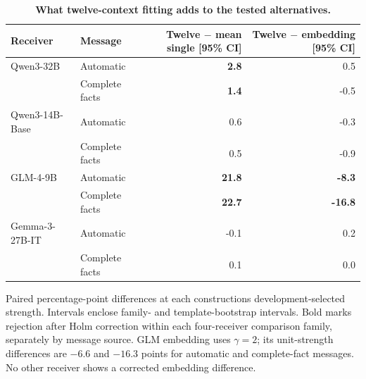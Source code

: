 \begin{table}[H]
\caption{\textbf{What twelve-context fitting adds to the tested alternatives.}}
\label{tab:wordif_representation_contrasts}
\centering\small
\setlength{\tabcolsep}{3pt}\renewcommand{\arraystretch}{1.12}
\begin{tabular*}{\linewidth}{@{\extracolsep{\fill}}llrr@{}}
\toprule
Receiver & Message & \shortstack[r]{Twelve $-$ mean single\\{[95\% CI]}} & \shortstack[r]{Twelve $-$ embedding\\{[95\% CI]}} \\
\midrule
Qwen3-32B & Automatic & \textbf{2.8}\enspace {\footnotesize [1.0, 5.1]} & 0.5\enspace {\footnotesize [-0.7, 1.9]} \\
 & Complete facts & \textbf{1.4}\enspace {\footnotesize [0.6, 2.4]} & -0.5\enspace {\footnotesize [-1.2, 0.0]} \\
Qwen3-14B-Base & Automatic & 0.6\enspace {\footnotesize [0.0, 1.2]} & -0.3\enspace {\footnotesize [-1.2, 0.3]} \\
 & Complete facts & 0.5\enspace {\footnotesize [-0.8, 1.6]} & -0.9\enspace {\footnotesize [-2.1, 0.0]} \\
GLM-4-9B & Automatic & \textbf{21.8}\enspace {\footnotesize [17.1, 26.2]} & \textbf{-8.3}\enspace {\footnotesize [-12.0, -4.9]} \\
 & Complete facts & \textbf{22.7}\enspace {\footnotesize [17.3, 27.7]} & \textbf{-16.8}\enspace {\footnotesize [-27.1, -7.3]} \\
Gemma-3-27B-IT & Automatic & -0.1\enspace {\footnotesize [-0.3, 0.0]} & 0.2\enspace {\footnotesize [0.0, 0.5]} \\
 & Complete facts & 0.1\enspace {\footnotesize [0.0, 0.2]} & 0.0\enspace {\footnotesize [0.0, 0.0]} \\
\bottomrule
\end{tabular*}
\par\vspace{3pt}
{\footnotesize\raggedright Paired percentage-point differences at each construction\textquotesingle s development-selected strength. Intervals enclose family- and template-bootstrap intervals. Bold marks rejection after Holm correction within each four-receiver comparison family, separately by message source. GLM embedding uses $\gamma=2$; its unit-strength differences are $-6.6$ and $-16.3$ points for automatic and complete-fact messages. No other receiver shows a corrected embedding difference.\par}
\end{table}
